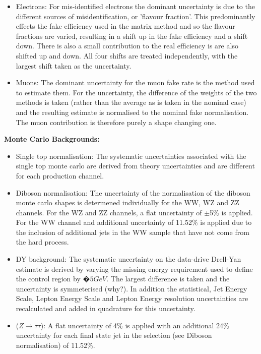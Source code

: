 \begin{itemize}
    \item Electrons: For mis-identified electrons the dominant uncertainty is due to the different sources of misidentification, or 'flavour fraction'. This predominantly effects the fake efficiency used in the matrix method and so the flavour fractions are varied, resulting in a shift up in the fake efficiency and a shift down. There is also a small contribution to the real efficiency is are also shifted up and down. All four shifts are treated independently, with the largest shift taken as the uncertainty.
    \item Muons: The dominant uncertainty for the muon fake rate is the method used to estimate them. For the uncertainty, the difference of the weights of the two methods is taken (rather than the average as is taken in the nominal case) and the resulting estimate is normalised to the nominal fake normalisation. The muon contribution is therefore purely a shape changing one.
\end{itemize}

\vspace{5mm}
\noindent
\textbf{Monte Carlo Backgrounds:}
\begin{itemize}
    \item Single top normalisation: The systematic uncertainties associated with the single top monte carlo are derived from theory uncertainties and are different for each production channel. 
    \item Diboson normalisation: The uncertainty of the normalisation of the diboson monte carlo shapes is determened individually for the WW, WZ and ZZ channels. For the WZ and ZZ channels, a flat uncertainty of $\pm$5\% is applied. For the WW channel and additional uncertainty of 11.52\% is applied due to the inclusion of additional jets in the WW sample that have not come from the hard process. 
    \item DY background: The systematic uncertainty on the data-drive Drell-Yan estimate is derived by varying the missing energy requirement used to define the control region by $�5 GeV$. The largest difference is taken and the uncertainty is symmeterised (why?). In addition the statistical, Jet Energy Scale, Lepton Energy Scale and Lepton Energy resolution uncertainties are recalculated and added in quadrature for this uncertainty. 
    \item ($Z\rightarrow\tau\tau$): A flat uncertainty of 4\% is applied with an additional 24\% uncertainty for each final state jet in the selection (see Diboson normalisation) of 11.52\%.
\end{itemize}

